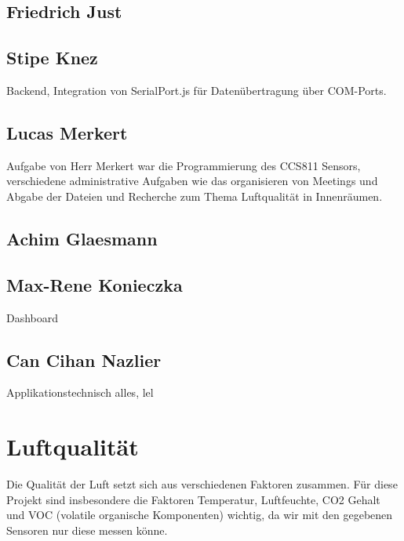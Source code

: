 \documentclass[]{article}
\begin{document}
		\subsection{Friedrich Just}
		\subsection{Stipe Knez}
			Backend, Integration von SerialPort.js für Datenübertragung über COM-Ports. 
		\subsection{Lucas Merkert}
			Aufgabe von Herr Merkert war die Programmierung des CCS811 Sensors, verschiedene administrative Aufgaben wie das organisieren von Meetings und Abgabe der Dateien und Recherche zum Thema Luftqualität in Innenräumen.
		\subsection{Achim Glaesmann}
		\subsection{Max-Rene Konieczka}
			Dashboard
		\subsection{Can Cihan Nazlier}
			Applikationstechnisch alles, lel
		
	\section{Luftqualität}%
		Die Qualität der Luft setzt sich aus verschiedenen Faktoren zusammen. Für diese Projekt sind insbesondere die Faktoren Temperatur, Luftfeuchte, CO2 Gehalt und VOC (volatile organische Komponenten) wichtig, da wir mit den gegebenen Sensoren nur diese messen könne.
\end{document}
